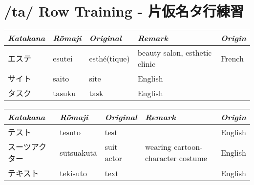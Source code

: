 \section{/ta/ Row Training - 片仮名タ行練習}
\Padding
\begin{longtable}[c]{p{2cm}p{2cm}p{3cm}p{6cm}p{2cm}}
\textit{Katakana}&\textit{Rōmaji}&\textit{Original}&\textit{Remark}&\textit{Origin}\\\hline
エステ        &esutei    &esthé(tique)&beauty salon, esthetic clinic    &French\\
サイト        &saito     &site        &English\\
タスク        &tasuku    &task        &English\\
\end{longtable}



\newpage
\Padding
\begin{longtable}[c]{p{3cm}p{2cm}p{2cm}p{6cm}p{2cm}}
\textit{Katakana}&\textit{Rōmaji}&\textit{Original}&\textit{Remark}&\textit{Origin}\\\hline
テスト        &tesuto    &test        &                                 &English\\
スーツアクター&sūtsuakutā&suit actor  &wearing cartoon-character costume&English\\
テキスト      &tekisuto  &text        &                                 &English\\
\end{longtable}



\newpage
